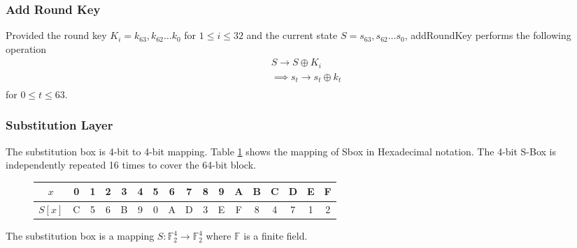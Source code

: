 \documentclass[preprint]{transcrypto}
\begin{document}
\subsubsection{Add Round Key}
Provided the round key $K_i = k_{63},k_{62} \dots k_0$ for $1\leq i \leq 32$ and the current state $S = s_{63},s_{62}\dots s_0$, addRoundKey performs the following operation
\begin{eqnarray*}
    S \xrightarrow{} S \oplus K_i \\
    \implies s_t \xrightarrow[]{} s_t \oplus k_t 
\end{eqnarray*}
for $0\leq t\leq 63$.

\subsubsection{Substitution Layer}
The substitution box is 4-bit to 4-bit mapping. Table \ref{tab:pSbox} shows the mapping of Sbox in Hexadecimal notation. The 4-bit S-Box is independently repeated 16 times to cover the 64-bit block.
\begin{figure}[h!]
    \centering
    \begin{tabular}{ |c||c|c|c|c|c|c|c|c|c|c|c|c|c|c|c|c| }
        \hline
        $x$ & 0 & 1 & 2 & 3&4& 5& 6&7&8&9&A&B&C&D&E&F  \\ \hline
        $S[x]$& C & 5 & 6& B &9 &0 &A &D& 3& E &F& 8& 4 &7& 1& 2 \\ \hline
    \end{tabular}
    \label{tab:pSbox}
\end{figure}
The substitution box is a mapping $S:\mathbb{F}_2^4\xrightarrow[]{}\mathbb{F}_2^4$ where $\mathbb{F}$ is a finite field. 
\end{document}
